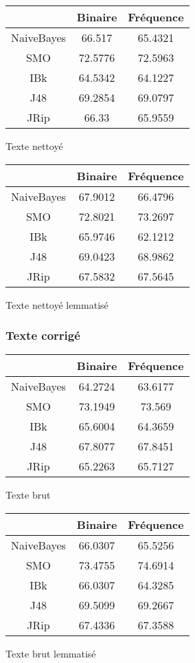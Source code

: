 \documentclass[a4paper,11pt]{report}
\begin{document}
\begin{minipage}{0.5\textwidth}
\begin{tabular}{|c|c|c|}
\hline
 & Binaire & Fréquence \\
 \hline
 NaiveBayes & 66.517 & 65.4321 \\
 \hline
 SMO & 72.5776 & 72.5963 \\
 \hline
 IBk & 64.5342 & 64.1227 \\
 \hline
 J48 & 69.2854 & 69.0797 \\
 \hline
 JRip & 66.33 & 65.9559 \\
 \hline
\end{tabular}
\caption{Texte nettoyé}
\end{minipage}
\begin{minipage}{0.5\textwidth}
\begin{tabular}{|c|c|c|}
\hline
 & Binaire & Fréquence \\
 \hline
 NaiveBayes & 67.9012 & 66.4796 \\
 \hline
 SMO & 72.8021 & 73.2697 \\
 \hline
 IBk & 65.9746 & 62.1212 \\
 \hline
 J48 & 69.0423 & 68.9862 \\
 \hline
 JRip & 67.5832 & 67.5645 \\
 \hline
\end{tabular}
\caption{Texte nettoyé lemmatisé}
\end{minipage}

\subsubsection{Texte corrigé}

\begin{minipage}{0.5\textwidth}
\begin{tabular}{|c|c|c|}
\hline
 & Binaire & Fréquence \\
 \hline
 NaiveBayes & 64.2724  & 63.6177 \\
 \hline
 SMO & 73.1949 & 73.569 \\
 \hline
 IBk & 65.6004 & 64.3659 \\
 \hline
 J48 & 67.8077 & 67.8451 \\
 \hline
 JRip & 65.2263 & 65.7127 \\
 \hline
\end{tabular}
\caption{Texte brut}
\end{minipage}
\begin{minipage}{0.5\textwidth}
\begin{tabular}{|c|c|c|}
\hline
 & Binaire & Fréquence \\
 \hline
 NaiveBayes & 66.0307 & 65.5256 \\
 \hline
 SMO & 73.4755 & 74.6914 \\
 \hline
 IBk & 66.0307 & 64.3285 \\
 \hline
 J48 & 69.5099 & 69.2667 \\
 \hline
 JRip & 67.4336 & 67.3588 \\
 \hline
\end{tabular}
\caption{Texte brut lemmatisé}
\end{minipage}
\end{document}
